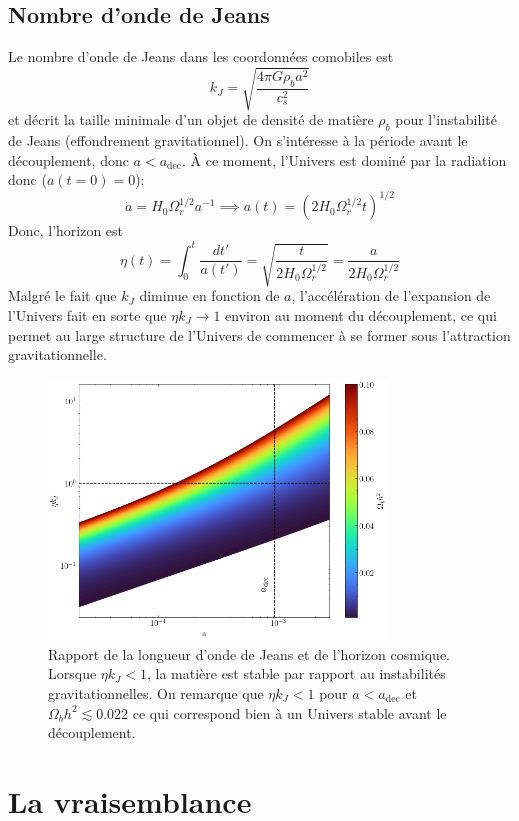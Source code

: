 \documentclass{article}
\numberwithin{equation}{section}
\begin{document}
\subsection{Nombre d'onde de Jeans}
Le nombre d'onde de Jeans dans les coordonnées comobiles est 
\[
        k_J = \sqrt{\frac{4\pi G \rho_b a^2}{c_s^2}}
\]
et décrit la taille minimale d'un objet de densité de matière $\rho_b$ 
pour l'instabilité de Jeans (effondrement gravitationnel). 
On s'intéresse à la période avant le découplement, donc 
$a < a_{\text{dec}}$. À ce moment, l'Univers est dominé par 
la radiation donc ($a(t=0) = 0$):
\[
        \dot{a} = H_0 \Omega_r^{1/2}a^{-1} \implies 
        a(t) = \left( 2H_0\Omega_r^{1/2} t \right)^{1/2}
\]
Donc, l'horizon est
\[
        \eta(t) = \int_{0}^{t} \frac{dt'}{a(t')} 
        = \sqrt{\frac{t}{2H_0\Omega_r^{1/2}}} = \frac{a}{2H_0 \Omega_r^{1/2}}
\]
Malgré le fait que $k_J$ diminue en fonction de $a$, l'accélération 
de l'expansion de l'Univers fait en sorte que $\eta k_J \rightarrow 1$ 
environ au moment du découplement, ce qui permet au large structure de 
l'Univers de commencer à se former sous l'attraction gravitationnelle.
\begin{figure}[H]
        \centering
        \includegraphics[width=0.8\textwidth]{eta_kj}
        \caption{Rapport de la longueur d'onde de Jeans et de l'horizon cosmique. 
        Lorsque $\eta k_J < 1$, la matière est stable par rapport au instabilités gravitationnelles. On 
remarque que $\eta k_J < 1$ pour $a < a_{\text{dec}}$ et $\Omega_b h^2 \lesssim 0.022$ 
ce qui correspond bien à un Univers stable avant 
le découplement.}
\end{figure}


\section{La vraisemblance}
\end{document}

